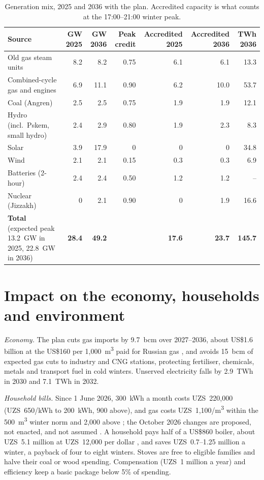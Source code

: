 \documentclass[11pt,letterpaper]{article}
\newcommand{\headrow}{\rowcolor{rowblue}}
\begin{document}
\begin{table}[!t]
\centering\footnotesize
\caption{Generation mix, 2025 and 2036 with the plan. Accredited capacity is what counts at the 17:00--21:00 winter peak.}\label{tab:mix}
\setlength{\tabcolsep}{4pt}
\begin{tabularx}{\textwidth}{@{}Yrrrrrr@{}}
\toprule
\headrow Source & GW 2025 & GW 2036 & Peak credit & Accredited 2025 & Accredited 2036 & TWh 2036 \\
\midrule
Old gas steam units & 8.2 & 8.2 & 0.75 & 6.1 & 6.1 & 13.3 \\
Combined-cycle gas and engines & 6.9 & 11.1 & 0.90 & 6.2 & 10.0 & 53.7 \\
Coal (Angren) & 2.5 & 2.5 & 0.75 & 1.9 & 1.9 & 12.1 \\
Hydro (incl.\ Pskem, small hydro) & 2.4 & 2.9 & 0.80 & 1.9 & 2.3 & 8.3 \\
Solar & 3.9 & 17.9 & 0 & 0 & 0 & 34.8 \\
Wind & 2.1 & 2.1 & 0.15 & 0.3 & 0.3 & 6.9 \\
Batteries (2-hour) & 2.4 & 2.4 & 0.50 & 1.2 & 1.2 & -- \\
Nuclear (Jizzakh) & 0 & 2.1 & 0.90 & 0 & 1.9 & 16.6 \\
\midrule
\textbf{Total} (expected peak 13.2~GW in 2025, 22.8~GW in 2036) & \textbf{28.4} & \textbf{49.2} & & \textbf{17.6} & \textbf{23.7} & \textbf{145.7} \\
\bottomrule
\end{tabularx}
\end{table}

\section{Impact on the economy, households and environment}\label{sec:impact}

\textit{Economy.} The plan cuts gas imports by 9.7~bcm over 2027--2036, about US\$1.6 billion at the US\$160 per 1,000~m\textsuperscript{3} paid for Russian gas \cite{kun-gazprom}, and avoids 15~bcm of expected gas cuts to industry and CNG stations, protecting fertiliser, chemicals, metals and transport fuel in cold winters. Unserved electricity falls by 2.9~TWh in 2030 and 7.1~TWh in 2032.

\textit{Household bills.} Since 1 June 2026, 300~kWh a month costs UZS~220,000 (UZS~650/kWh to 200~kWh, 900 above), and gas costs UZS~1,100/m\textsuperscript{3} within the 500~m\textsuperscript{3} winter norm and 2,000 above \cite{moe-tariff,kun-tariff2026}; the October 2026 changes are proposed, not enacted, and not assumed \cite{moe-proposals}. A household pays half of a US\$860 boiler, about UZS~5.1 million at UZS~12,000 per dollar \cite{zamin-fx}, and saves UZS~0.7--1.25 million a winter, a payback of four to eight winters. Stoves are free to eligible families and halve their coal or wood spending. Compensation (UZS~1 million a year) \cite{wb-reforms} and efficiency keep a basic package below 5\% of spending.
\end{document}
